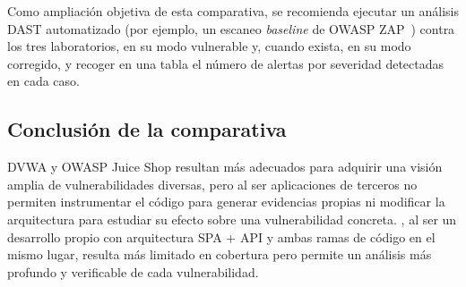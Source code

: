 Como ampliación objetiva de esta comparativa, se recomienda ejecutar un
análisis DAST automatizado (por ejemplo, un escaneo \emph{baseline} de OWASP
ZAP~) contra los tres laboratorios, en su modo vulnerable y, cuando exista,
en su modo corregido, y recoger en una tabla el número de alertas por
severidad detectadas en cada caso.

\subsection{Conclusión de la comparativa}

DVWA y OWASP Juice Shop resultan más adecuados para adquirir una visión
amplia de vulnerabilidades diversas, pero al ser aplicaciones de
terceros no permiten instrumentar el código para generar evidencias propias
ni modificar la arquitectura para estudiar su efecto sobre una
vulnerabilidad concreta. \breachlab, al ser un desarrollo propio con
arquitectura SPA + API y ambas ramas de código en el mismo lugar, resulta
más limitado en cobertura pero permite un análisis más profundo y
verificable de cada vulnerabilidad.
